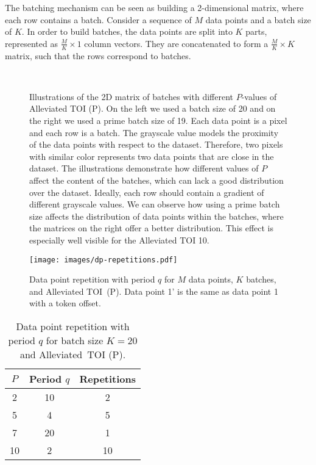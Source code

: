 \documentclass[11pt,a4paper]{article}
\begin{document}
The batching mechanism can be seen as building a 2-dimensional matrix, where each row contains a batch. Consider a sequence of $M$ data points and a batch size of $K$. In order to build batches, the data points are split into $K$ parts, represented as $\frac{M}{K} \times 1$ column vectors. They are concatenated to form a $\frac{M}{K} \times K$ matrix, such that the rows correspond to batches.

\begin{figure*}
  \centering
  \mbox{
    \quad
  }
  \caption{Illustrations of the 2D matrix of batches with different $P$-values of Alleviated TOI (P). On the left we used a batch size of 20 and on the right we used a prime batch size of 19. Each data point is a pixel and each row is a batch. The grayscale value models the proximity of the data points with respect to the dataset. Therefore, two pixels with similar color represents two data points that are close in the dataset. The illustrations demonstrate how different values of $P$ affect the content of the batches, which can lack a good distribution over the dataset. Ideally, each row should contain a gradient of different grayscale values.
  We can observe how using a prime batch size affects the distribution of data points within the batches, where the matrices on the right offer a better distribution. This effect is especially well visible for the Alleviated TOI 10.
  }
  \label{fig:datapoints as pixels}
\end{figure*}

\begin{figure}
    \centering
    \texttt{[image: images/dp-repetitions.pdf]}
    \caption{Data point repetition with period $q$ for $M$ data points, $K$ batches, and Alleviated TOI~(P). Data point 1' is the same as data point 1 with a token offset.}
    \label{fig:period}
\end{figure}

\begin{table}[t]
\centering
\begin{tabular}{@{}ccc@{}}
\toprule
\textbf{$P$} & \textbf{Period $q$} & \textbf{Repetitions} \\ \midrule
2                    & 10             & 2              \\
5                    & 4            & 5               \\
7                    & 20            & 1              \\
10                   & 2             & 10               \\ \bottomrule
\end{tabular}
\caption{Data point repetition with period $q$ for batch size $K=20$ and Alleviated~TOI (P).}
\label{finite period}
\end{table}
\end{document}
